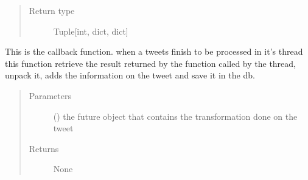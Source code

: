 \documentclass[letterpaper,10pt,english]{sphinxmanual}
\begin{document}
\begin{fulllineitems}
\begin{fulllineitems}
\begin{quote}
\begin{description}
\item[{Return type}] \leavevmode
\sphinxAtStartPar
Tuple{[}int, dict, dict{]}

\end{description}\end{quote}

\end{fulllineitems}


\begin{fulllineitems}
\label{\detokenize{code_comment/tweet_processor:hate_tweet_map.tweets_processor.TweetProcessor.ProcessTweet.__save}}
\sphinxAtStartPar
This is the callback function. when a tweets finish to be processed in it’s thread
this function retrieve the result returned by the function called by the thread, unpack it,
adds the information on the tweet and save it in the db.
\begin{quote}\begin{description}
\item[{Parameters}] \leavevmode
\sphinxAtStartPar
{} () \textendash{} the future object that contains the transformation done on the tweet

\item[{Returns}] \leavevmode
\sphinxAtStartPar
None

\end{description}\end{quote}

\end{fulllineitems}



\end{fulllineitems}
\end{document}
